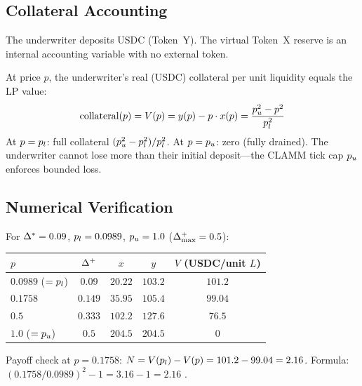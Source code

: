 \subsection{Collateral Accounting}

The underwriter deposits USDC (Token~Y). The virtual Token~X reserve is
an internal accounting variable with no external token.

\begin{definition}\label{def:collateral-value}
At price $p$, the underwriter's real (USDC) collateral per unit liquidity equals
the LP value:
\begin{equation}\label{eq:collateral-value}
  \text{collateral}(p) = V(p) = y(p) - p \cdot x(p) = \frac{p_u^2 - p^2}{p_l^2}
\end{equation}
At $p = p_l$: full collateral $(p_u^2 - p_l^2)/p_l^2$.
At $p = p_u$: zero (fully drained). The underwriter cannot lose more than
their initial deposit---the CLAMM tick cap $p_u$ enforces bounded loss.
\end{definition}

\subsection{Numerical Verification}

For $\Delta^{*} = 0.09$, $p_l = 0.0989$, $p_u = 1.0$ ($\Delta^{+}_{\max} = 0.5$):

\begin{center}
\begin{tabular}{@{}lcccc@{}}
\toprule
$p$ & $\Delta^{+}$ & $x$ & $y$ & $V$ (USDC/unit $L$) \\
\midrule
$0.0989$ ($= p_l$) & $0.09$ & $20.22$ & $103.2$ & $101.2$ \\
$0.1758$ & $0.149$ & $35.95$ & $105.4$ & $99.04$ \\
$0.5$ & $0.333$ & $102.2$ & $127.6$ & $76.5$ \\
$1.0$ ($= p_u$) & $0.5$ & $204.5$ & $204.5$ & $0$ \\
\bottomrule
\end{tabular}
\end{center}

Payoff check at $p = 0.1758$: $N = V(p_l) - V(p) = 101.2 - 99.04 = 2.16$.
Formula: $(0.1758/0.0989)^2 - 1 = 3.16 - 1 = 2.16$ \checkmark.
